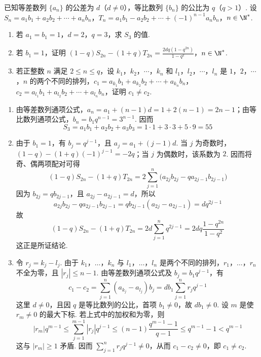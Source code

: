 \begin{problem}
已知等差数列 \(\{a_{n}\}\) 的公差为 \(d\)（\(d \neq 0\)），等比数列 \(\{b_{n}\}\) 的公比为 \(q\)（\(q > 1\)）. 设 \(S_{n} = a_{1}b_{1} + a_{2}b_{2} + \cdots + a_{n}b_{n}\)，\(T_{n} = a_{1}b_{1} - a_{2}b_{2} + \cdots + (-1)^{n - 1}a_{n}b_{n}\)，\(n \in \N^{*}\).

\begin{enumerate}
\item 若 \(a_1 = b_1 = 1\)，\(d = 2\)，\(q = 3\)，求 \(S_3\) 的值.
\item 若 \(b_{1} = 1\)，证明 \((1 - q)S_{2n} - (1 + q)T_{2n} = \frac{2dq(1 - q^{2n})}{1 - q^{2}}\)，\(n \in \N^{*}\).
\item 若正整数 \(n\) 满足 \(2 \leqslant n \leqslant q\)，设 \(k_{1}\)，\(k_{2}\)，\(\cdots\)，\(k_{n}\) 和 \(l_{1}\)，\(l_{2}\)，\(\cdots\)，\(l_{n}\) 是 \(1\)，\(2\)，\(\cdots\)，\(n\) 的两个不同的排列，\(c_{1} = a_{k_1} b_1 + a_{k_2} b_2 + \cdots + a_{k_n} b_n\)，\(c_{2} = a_{l_1} b_1 + a_{l_2} b_2 + \cdots + a_{l_n} b_n\)，证明 \(c_{1} \neq c_{2}\).
\end{enumerate}
\end{problem}

\begin{solution}
\begin{enumerate}
\item 由等差数列通项公式，\(a_n=a_1+(n-1)d=1+2(n-1)=2n-1\)；由等比数列通项公式，\(b_n=b_1q^{n-1}=3^{n-1}\). 因而
\[
S_3=a_1b_1+a_2b_2+a_3b_3=1\cdot1+3\cdot3+5\cdot9=55
\]
\item 由于 \(b_1=1\)，有 \(b_j=q^{j-1}\)，且 \(a_j=a_1+(j-1)d\). 当 \(j\) 为奇数时，\((1-q)-(1+q)(-1)^{j-1}=-2q\)；当 \(j\) 为偶数时，该系数为 \(2\). 因而将奇、偶两项配对可得
\[
(1-q)S_{2n}-(1+q)T_{2n}=2\sum_{j=1}^{n}\bigl(a_{2j}b_{2j}-q a_{2j-1}b_{2j-1}\bigr)
\]
因为 \(b_{2j}=q b_{2j-1}\)，且 \(a_{2j}-a_{2j-1}=d\)，所以
\[
a_{2j}b_{2j}-q a_{2j-1}b_{2j-1}
=q b_{2j-1}(a_{2j}-a_{2j-1})=dq^{2j-1}
\]
故
\[
(1-q)S_{2n}-(1+q)T_{2n}=2d\sum_{j=1}^{n}q^{2j-1}
=2dq\frac{1-q^{2n}}{1-q^2}
\]
这正是所证结论.
\item 令 \(r_j=k_j-l_j\). 由于 \(k_1\)，\(\ldots\)，\(k_n\) 与 \(l_1\)，\(\ldots\)，\(l_n\) 是两个不同的排列，\(r_1\)，\(\ldots\)，\(r_n\) 不全为零，且 \(|r_j|\leq n-1\). 由等差数列通项公式及 \(b_j=b_1q^{j-1}\)，有
\[
c_1-c_2=\sum_{j=1}^{n}(a_{k_j}-a_{l_j})b_j
=d b_1\sum_{j=1}^{n}r_jq^{j-1}
\]
这里 \(d\ne0\)，且因 \(q\) 是等比数列的公比，首项 \(b_1\ne0\)，故 \(d b_1\ne0\). 设 \(m\) 是使 \(r_m\ne0\) 的最大下标. 若上式中的加权和为零，则
\[
|r_m|q^{m-1}\leq\sum_{j=1}^{m-1}|r_j|q^{j-1}
\leq(n-1)\frac{q^{m-1}-1}{q-1}
\leq q^{m-1}-1<q^{m-1}
\]
这与 \(|r_m|\geq1\) 矛盾. 因而 \(\sum_{j=1}^{n}r_jq^{j-1}\ne0\)，从而 \(c_1-c_2\ne0\)，即 \(c_1\ne c_2\).
\end{enumerate}
\end{solution}
